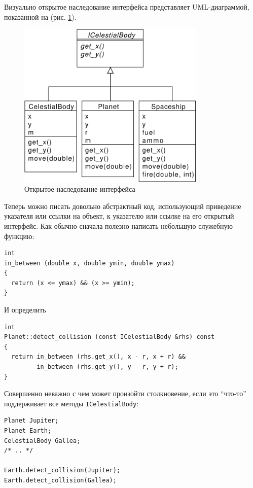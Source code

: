\documentclass[a4paper,12pt,oneside]{article}
\begin{document}
Визуально открытое наследование интерфейса представляет UML-диаграммой, показанной на (рис. \ref{fig:inheritance-interface}).

\begin{figure}[ht]
\centering
\includegraphics[width=0.8\textwidth]{illustrations/intf-inheritance-crop.pdf}
\caption{Открытое наследование интерфейса}
\label{fig:inheritance-interface}
\end{figure}

Теперь можно писать довольно абстрактный код, использующий приведение указателя или ссылки на объект, к указателю или ссылке на его открытый интерфейс. Как обычно сначала полезно написать небольшую служебную функцию:

\begin{lstlisting}
int 
in_between (double x, double ymin, double ymax)
{
  return (x <= ymax) && (x >= ymin);
}
\end{lstlisting}

И определить

\begin{lstlisting}
int 
Planet::detect_collision (const ICelestialBody &rhs) const
{
  return in_between (rhs.get_x(), x - r, x + r) && 
         in_between (rhs.get_y(), y - r, y + r);
}
\end{lstlisting}

Совершенно неважно с чем может произойти столкновение, если это ``что-то'' поддерживает все методы \lstinline!ICelestialBody!:

\begin{lstlisting}
Planet Jupiter;
Planet Earth;
CelestialBody Gallea;
/* .. */

Earth.detect_collision(Jupiter); 
Earth.detect_collision(Gallea);
\end{lstlisting}
\end{document}
